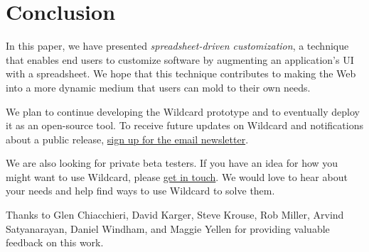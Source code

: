 \documentclass[english,submission]{programming}
\begin{document}
\hypertarget{conclusion}{%
\section{Conclusion}\label{conclusion}}

In this paper, we have presented \emph{spreadsheet-driven
customization}, a technique that enables end users to customize software
by augmenting an application's UI with a spreadsheet. We hope that this
technique contributes to making the Web into a more dynamic medium that
users can mold to their own needs.

We plan to continue developing the Wildcard prototype and to eventually
deploy it as an open-source tool. To receive future updates on Wildcard
and notifications about a public release,
\href{https://geoffreylitt.substack.com/welcome}{sign up for the email
newsletter}.

We are also looking for private beta testers. If you have an idea for
how you might want to use Wildcard, please
\href{mailto:glitt@mit.edu}{get in touch}. We would love to hear about
your needs and help find ways to use Wildcard to solve them.

\acks
Thanks to Glen Chiacchieri, David Karger, Steve Krouse, Rob Miller, Arvind Satyanarayan, Daniel Windham, and Maggie Yellen for providing valuable feedback on this work.

\printbibliography
\end{document}
